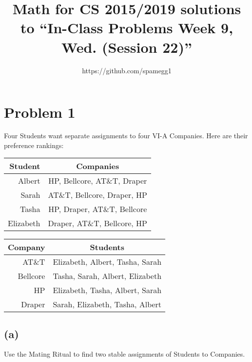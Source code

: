 \documentclass[14pt]{extarticle}
\title{Math for CS 2015/2019 solutions to ``In-Class Problems Week 9, Wed. (Session 22)''}
\author{https://github.com/spamegg1}
\begin{document}
\maketitle
\tableofcontents

\section{Problem 1}
Four Students want separate assignments to four VI-A Companies. Here are their preference rankings:

\begin{center}
\begin{tabular}{r|c}
Student & Companies \\
\hline
Albert & HP, Bellcore, AT\&T, Draper \\
Sarah & AT\&T, Bellcore, Draper, HP\\
Tasha & HP, Draper, AT\&T, Bellcore\\
Elizabeth & Draper, AT\&T, Bellcore, HP
\end{tabular}

\begin{tabular}{r|c}
Company & Students\\
\hline
AT\&T & Elizabeth, Albert, Tasha, Sarah \\
Bellcore & Tasha, Sarah, Albert, Elizabeth\\
HP & Elizabeth, Tasha, Albert, Sarah\\
Draper & Sarah, Elizabeth, Tasha, Albert
\end{tabular}
\end{center}

\subsection{(a)}
Use the Mating Ritual to find two stable assignments of Students to Companies.
\end{document}
